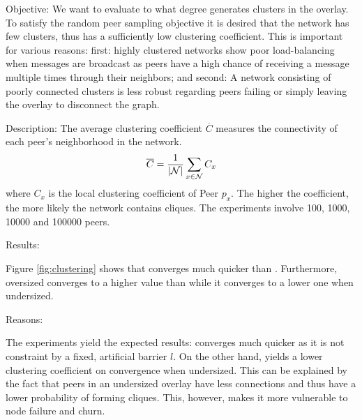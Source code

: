 \begin{asparadesc}
\item[Objective:]
    We want to evaluate to what degree \SCAMPLON{} generates clusters in the overlay.
    To satisfy the random peer sampling objective it is desired that the network has few clusters,
    thus has a sufficiently low clustering coefficient.
    This is important for various reasons:
    first: highly clustered networks show poor load-balancing when messages are broadcast as
    peers have a high chance of receiving a message multiple times through their neighbors;
    and second: A network consisting of poorly connected clusters is less robust regarding peers failing
    or simply leaving the overlay to disconnect the graph. 
\item[Description:] 
    The average clustering coefficient $\overline{C}$  measures the connectivity of each peer's neighborhood in the network.
  \begin{equation}
    \overline{C} = {1\over |\mathcal{N}|}\sum\limits_{x\in\mathcal{N}}C_x
    \end{equation}
    where $C_x$ is the local clustering coefficient of Peer $p_x$. The higher
    the coefficient, the more likely the network contains cliques. 
    The experiments involve 100, 1000, 10000 and 100000 peers. 


\item[Results:]

    Figure \ref{fig:clustering} shows that \SCAMPLON{} converges much quicker than \CYCLON{}.
    Furthermore, oversized \CYCLON{} converges to a higher value than \SCAMPLON while 
    it converges to a lower one when undersized.

\item[Reasons:]

    The experiments yield the expected results: 
    \SCAMPLON{} converges much quicker as it is not constraint by a fixed, artificial barrier $l$.
    On the other hand, \CYCLON{} yields a lower clustering coefficient on convergence when undersized.
    This can be explained by the fact that peers in an undersized \CYCLON{} overlay have less connections and 
    thus have a lower probability of forming cliques.
    This, however, makes it more vulnerable to node failure and churn.

\end{asparadesc}



